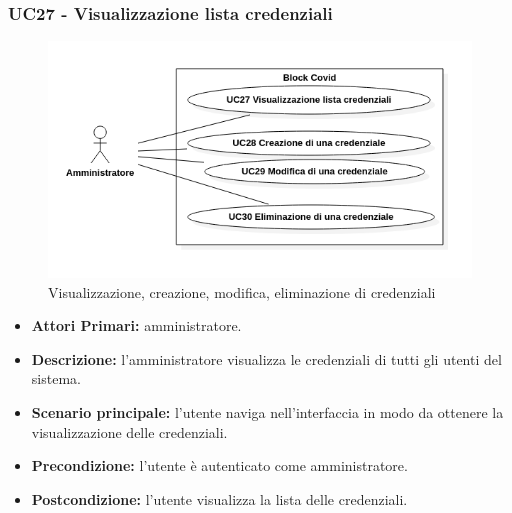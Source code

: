 \subsubsection{ UC27 - Visualizzazione lista credenziali}
\begin{figure}[H]
	\centering
	\includegraphics[width=15cm]{res/images/UC27-28-29-30.png}
	\caption{Visualizzazione, creazione, modifica, eliminazione di credenziali}
	\label{fig:Visualizzazione, creazione, modifica, eliminazione di credenziali}
\end{figure}
\begin{itemize}
	\item\textbf{Attori Primari:} 
	amministratore.
	\item\textbf{Descrizione:} 
	l'amministratore visualizza le credenziali di tutti gli utenti del sistema.
	\item\textbf{Scenario principale:} 
	l'utente naviga nell'interfaccia in modo da ottenere la visualizzazione delle credenziali.
	\item\textbf{Precondizione:} 
	l'utente è autenticato come amministratore.
	\item\textbf{Postcondizione:}
	l'utente visualizza la lista delle credenziali.
\end{itemize}

